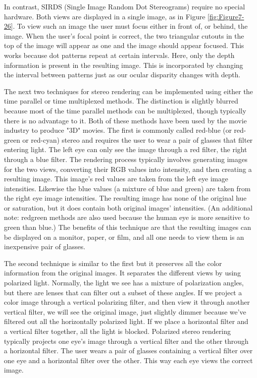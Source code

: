 In contrast, SIRDS (Single Image Random Dot Stereograms) require no special hardware. Both views are displayed in a single image, as in Figure \ref{fig:Figure7-26}. To view such an image the user must focus either in front of, or behind, the image. When the user's focal point is correct, the two triangular cutouts in the top of the image will appear as one and the image should appear focused. This works because dot patterns repeat at certain intervals. Here, only the depth information is present in the resulting image. This is incorporated by changing the interval between patterns just as our ocular disparity changes with depth.

The next two techniques for stereo rendering can be implemented using either the time parallel or time multiplexed methods. The distinction is slightly blurred because most of the time parallel methods can be multiplexed, though typically there is no advantage to it. Both of these methods have been used by the movie industry to produce "3D" movies. The first is commonly called red-blue (or red-green or red-cyan) stereo and requires the user to wear a pair of glasses that filter entering light. The left eye can only see the image through a red filter, the right through a blue filter. The rendering process typically involves generating images for the two views, converting their RGB values into intensity, and then creating a resulting image. This image's red values are taken from the left eye image intensities. Likewise the blue values (a mixture of blue and green) are taken from the right eye image intensities. The resulting image has none of the original hue or saturation, but it does contain both original images' intensities. (An additional note: redgreen methods are also used because the human eye is more sensitive to green than blue.) The benefits of this technique are that the resulting images can be displayed on a monitor, paper, or film, and all one needs to view them is an inexpensive pair of glasses.

The second technique is similar to the first but it preserves all the color information from the original images. It separates the different views by using polarized light. Normally, the light we see has a mixture of polarization angles, but there are lenses that can filter out a subset of these angles. If we project a color image through a vertical polarizing filter, and then view it through another vertical filter, we will see the original image, just slightly dimmer because we've filtered out all the horizontally polarized light. If we place a horizontal filter and a vertical filter together, all the light is blocked. Polarized stereo rendering typically projects one eye's image through a vertical filter and the other through a horizontal filter. The user wears a pair of glasses containing a vertical filter over one eye and a horizontal filter over the other. This way each eye views the correct image.

